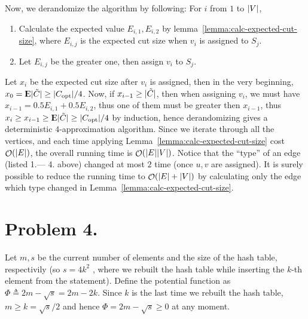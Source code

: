 \documentclass[12pt, a4paper]{article}
\DeclarePairedDelimiter{\abs}{\lvert}{\rvert}
\newcommand{\defeq}{\triangleq}
\DeclareMathOperator{\Expect}{{\rm I\kern-.3em E}}
\DeclareMathOperator*{\ord}{\mathcal{O}}
\begin{document}
Now, we derandomize the algorithm by following: For $i$ from $1$ to $\abs{V}$,
\begin{enumerate}
  \item Calculate the expected value $E_{i, 1}, E_{i, 2}$
    by lemma~\ref{lemma:calc-expected-cut-size}, where $E_{i, j}$
    is the expected cut size when $v_i$ is assigned to $S_j$.
  \item Let $E_{i, j}$ be the greater one, then assign $v_i$ to $S_j$.
\end{enumerate}
Let $x_i$ be the expected cut size after $v_i$ is assigned,
then in the very beginning, $x_0 = \Expect \abs{\tilde{C}} \geq \abs{C_{\text{opt}}} / 4$.
Now, if $x_{i-1} \geq \abs{\tilde{C}}$, then when assigning $v_i$,
we must have $x_{i-1} = 0.5 E_{i, 1} + 0.5 E_{i, 2}$, thus one of them must
be greater then $x_{i-1}$, thus $x_{i} \geq x_{i-1} \geq \Expect \abs{\tilde{C}} \geq \abs{C_{\text{opt}}} / 4$
by induction, hence derandomizing gives a deterministic $4$-approximation algorithm.
Since we iterate through all the vertices, and each time applying Lemma~\ref{lemma:calc-expected-cut-size}
cost $\ord(\abs{E})$, the overall running time is $\ord(\abs{E} \abs{V})$.
Notice that the ``type'' of an edge (listed 1.--- 4. above) changed at most $2$
time (once $u, v$ are assigned). It is surely possible to reduce the
running time to $\ord(\abs{E} + \abs{V})$ by calculating only the edge
which type changed in Lemma~\ref{lemma:calc-expected-cut-size}.

\section{Problem 4.}

Let $m, s$ be the current number of elements and the size of the hash table, respectivily
(so $s = 4k^2$ , where we rebuilt the hash table while inserting the $k$-th element from the statement).
Define the potential function as $\Phi \defeq 2m - \sqrt{s} = 2m - 2k$. Since $k$
is the last time we rebuilt the hash table, $m \geq k = \sqrt{s}/2$ and hence $\Phi = 2m - \sqrt{s} \geq 0$
at any moment.
\end{document}
